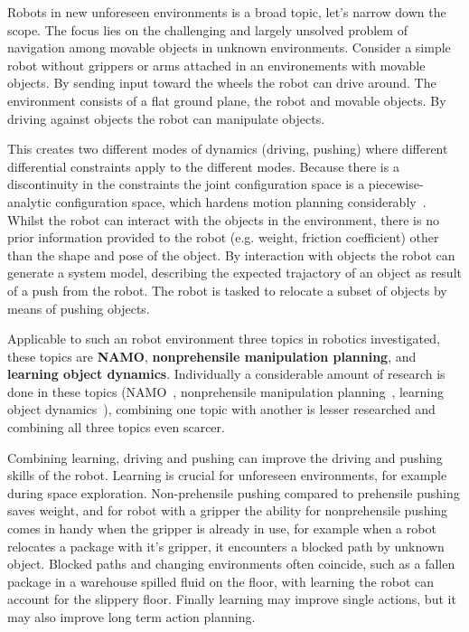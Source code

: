 Robots in new unforeseen environments is a broad topic, let's narrow down the scope. The focus lies on the challenging and largely unsolved problem of navigation among movable objects in unknown environments. Consider a simple robot without grippers or arms attached in an environements with movable objects. By sending input toward the wheels the robot can drive around. The environment consists of a flat ground plane, the robot and movable objects. By driving against objects the robot can manipulate objects.\bs 

This creates two different modes of dynamics (driving, pushing) where different differential constraints apply to the different modes. Because there is a discontinuity in the constraints the joint configuration space is a piecewise-analytic configuration space, which hardens motion planning considerably~\cite{vega-brown_asymptotically_2020}. Whilst the robot can interact with the objects in the environment, there is no prior information provided to the robot (e.g. weight, friction coefficient) other than the shape and pose of the object. By interaction with objects the robot can generate a system model, describing the expected trajactory of an object as result of a push from the robot. The robot is tasked to relocate a subset of objects by means of pushing objects. \bs

Applicable to such an robot environment three topics in robotics investigated, these topics are \textbf{\ac{NAMO}}, \textbf{nonprehensile manipulation planning}, and \textbf{learning object dynamics}. Individually a considerable amount of research is done in these topics (\ac{NAMO}~\cite{wang_affordancebased_2020,lavalle_planning_2006,elbanhawi_samplingbased_2014,kingston_samplingbased_2018,chen_fast_2018,ellis_navigation_2022}, nonprehensile manipulation planning~\cite{arruda_uncertainty_2017,mericli_pushmanipulation_2015,toussaint_sequenceofconstraints_2022,stuber_let_2020,stuber_featurebased_2018,bauza_dataefficient_2018}, learning object dynamics~\cite{seegmiller_vehicle_2013,cong_selfadapting_2020}), combining one topic with another is lesser researched and combining all three topics even scarcer.\bs

Combining learning, driving and pushing can improve the driving and pushing skills of the robot. Learning is crucial for unforeseen environments, for example during space exploration. Non-prehensile pushing compared to prehensile pushing saves weight, and for robot with a gripper the ability for nonprehensile pushing comes in handy when the gripper is already in use, for example when a robot relocates a package with it's gripper, it encounters a blocked path by unknown object. Blocked paths and changing environments often coincide, such as a fallen package in a warehouse spilled fluid on the floor, with learning the robot can account for the slippery floor. Finally learning may improve single actions, but it may also improve long term action planning.\bs


